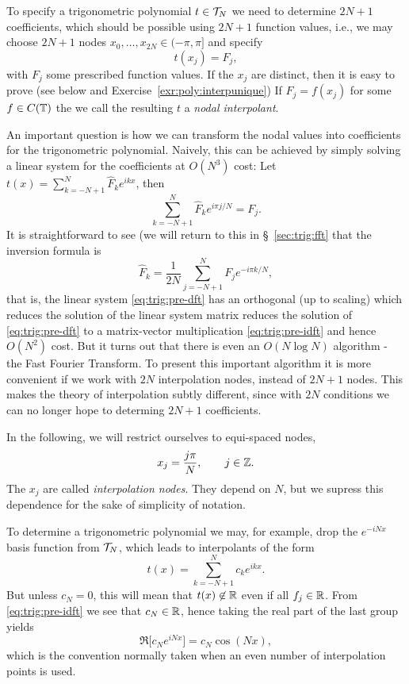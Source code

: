 To specify a trigonometric polynomial $t \in \mathcal{T}_N$ we need to determine
$2N+1$ coefficients, which should be possible using $2N+1$ function values,
i.e., we may choose $2N+1$ nodes $x_0, \dots, x_{2N} \in (-\pi, \pi]$
and specify
\[
    t(x_j) = F_j,
\]
with $F_j$ some prescribed function values. If the $x_j$ are distinct, then it
is easy to prove (see below and Exercise~\ref{exr:poly:interpunique}) If $F_j =
f(x_j)$ for some $f \in C(\mathbb{T})$ the we call the resulting $t$ a {\em nodal
interpolant}.

An important question is how we can transform the nodal values into coefficients
for the trigonometric polynomial. Naively, this can be achieved by simply
solving a linear system for the coefficients at $O(N^3)$ cost:
Let $t(x) = \sum_{k = -N+1}^N \hat{F}_k e^{ik x}$, then
\begin{equation} \label{eq:trig:pre-dft}
  \sum_{k = -N+1}^N \hat{F}_k e^{i\pi j/N} = F_j.
\end{equation}
It is straightforward to see (we will return to this in \S~\ref{sec:trig:fft}
that the inversion formula is
\begin{equation} \label{eq:trig:pre-idft}
    \hat{F}_k = \frac{1}{2N} \sum_{j = -N+1}^N F_j e^{-i\pi k/N},
\end{equation}
that is, the linear system \eqref{eq:trig:pre-dft}  has an orthogonal (up to
scaling) which reduces the solution of the linear system matrix reduces the
solution of \eqref{eq:trig:pre-dft} to a matrix-vector multiplication
\eqref{eq:trig:pre-idft} and hence $O(N^2)$ cost. But it turns out that there is
even an $O(N \log N)$ algorithm - the Fast Fourier Transform. To present this
important algorithm it is more convenient if we work with $2N$ interpolation
nodes, instead of $2N+1$ nodes. This makes the theory of interpolation subtly
different, since with $2N$ conditions we can no longer hope to determing $2N+1$
coefficients.

In the following, we will restrict ourselves to equi-spaced nodes,
\[
  x_j =  \frac{j \pi}{N},  \qquad j \in \mathbb{Z}.
\]
The $x_j$ are called {\em interpolation nodes}. They depend on $N$, but we
supress this dependence for the sake of simplicity of notation.

To determine a trigonometric polynomial we may, for example,
drop the $e^{-iNx}$ basis function from $\mathcal{T}_N$, which leads to
interpolants of the form
\[
    t(x) = \sum_{k = -N+1}^N c_k e^{ik x}.
\]
But unless $c_N = 0$, this will mean that $t(x) \not\in \mathbb{R}$ even if all $f_j \in
\mathbb{R}$. From \eqref{eq:trig:pre-idft} we see that $c_N \in \mathbb{R}$, hence taking
the real part of the last group yields
\[
    \Re \big[ c_N e^{i N x} \big]   = c_N \cos(Nx),
\]
which is the convention normally taken when an even number of interpolation
points is used.

